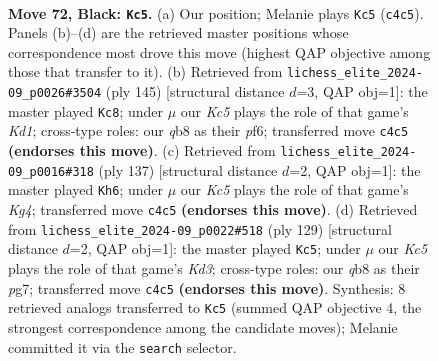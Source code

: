 \documentclass[11pt]{article}
\begin{document}
\clearpage

\begin{figure}[p]\centering
\begin{subfigure}{0.46\textwidth}\centering
\resizebox{\linewidth}{!}{%
\newchessgame
\chessboard[
  setfen={1Q6/6P1/4P3/7P/2k5/8/3K4/8 b - - 2 72},
  showmover=false,
  pgfstyle=straightmove, color=movearrow, markmove={c4-c5}
]}
\caption{}
\end{subfigure}\hfill
\begin{subfigure}{0.46\textwidth}\centering
\resizebox{\linewidth}{!}{%
\newchessgame
\chessboard[
  setfen={3k4/7P/3K1P2/8/7P/8/8/8 b - - 4 73},
  showmover=false,
  pgfstyle=straightmove, color=movearrow, markmove={d8-c8}
]}
\caption{}
\end{subfigure}
\\[4pt]
\begin{subfigure}{0.46\textwidth}\centering
\resizebox{\linewidth}{!}{%
\newchessgame
\chessboard[
  setfen={8/5P2/P7/3K2k1/1Q6/8/8/8 b - - 0 69},
  showmover=false,
  pgfstyle=straightmove, color=movearrow, markmove={g5-h6}
]}
\caption{}
\end{subfigure}\hfill
\begin{subfigure}{0.46\textwidth}\centering
\resizebox{\linewidth}{!}{%
\newchessgame
\chessboard[
  setfen={8/6PP/3k4/5K2/8/5P2/8/8 b - - 0 65},
  showmover=false,
  pgfstyle=straightmove, color=movearrow, markmove={d6-c5}
]}
\caption{}
\end{subfigure}
\caption{\textbf{Move 72, Black: \texttt{Kc5}.} (a) Our position; Melanie plays \texttt{Kc5} (\texttt{c4c5}). Panels (b)--(d) are the retrieved master positions whose correspondence most drove this move (highest QAP objective among those that transfer to it). (b) Retrieved from \texttt{lichess\_elite\_2024-09\_p0026\#3504} (ply 145) [structural distance $d$=3, QAP obj=1]: the master played \texttt{Kc8}; under $\mu$ our \emph{Kc5} plays the role of that game's \emph{Kd1}; cross-type roles: our \emph{q}b8 as their \emph{p}f6; transferred move \texttt{c4c5} \textbf{(endorses this move)}. (c) Retrieved from \texttt{lichess\_elite\_2024-09\_p0016\#318} (ply 137) [structural distance $d$=2, QAP obj=1]: the master played \texttt{Kh6}; under $\mu$ our \emph{Kc5} plays the role of that game's \emph{Kg4}; transferred move \texttt{c4c5} \textbf{(endorses this move)}. (d) Retrieved from \texttt{lichess\_elite\_2024-09\_p0022\#518} (ply 129) [structural distance $d$=2, QAP obj=1]: the master played \texttt{Kc5}; under $\mu$ our \emph{Kc5} plays the role of that game's \emph{Kd3}; cross-type roles: our \emph{q}b8 as their \emph{p}g7; transferred move \texttt{c4c5} \textbf{(endorses this move)}. Synthesis: 8 retrieved analogs transferred to \texttt{Kc5} (summed QAP objective 4, the strongest correspondence among the candidate moves); Melanie committed it via the \texttt{search} selector.}
\label{fig:thought-m143}
\end{figure}
\end{document}
